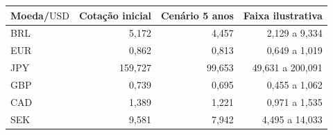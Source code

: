 \begin{tabular}{lrrr}
\toprule
Moeda/$\mathrm{USD}$ & Cotação inicial & Cenário 5 anos & Faixa ilustrativa \\
\midrule
BRL & 5,172 & 4,457 & 2,129 a 9,334 \\
EUR & 0,862 & 0,813 & 0,649 a 1,019 \\
JPY & 159,727 & 99,653 & 49,631 a 200,091 \\
GBP & 0,739 & 0,695 & 0,455 a 1,062 \\
CAD & 1,389 & 1,221 & 0,971 a 1,535 \\
SEK & 9,581 & 7,942 & 4,495 a 14,033 \\
\bottomrule
\end{tabular}